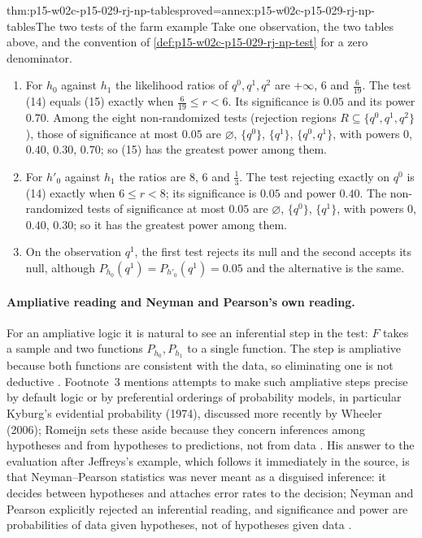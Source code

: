 \begin{hbtheorem}{thm:p15-w02c-p15-029-rj-np-tables}{proved=annex:p15-w02c-p15-029-rj-np-tables}{The two tests of the farm example}
Take one observation, the two tables above, and the convention of
\cref{def:p15-w02c-p15-029-rj-np-test} for a zero denominator.
\begin{enumerate}
\item For \(h_0\) against \(h_1\) the likelihood ratios of
  \(q^0,q^1,q^2\) are \(+\infty\), \(6\) and \(\tfrac{6}{19}\). The
  test (14) equals (15) exactly when \(\tfrac{6}{19}\le r<6\). Its
  significance is \(0.05\) and its power \(0.70\). Among the eight
  non-randomized tests (rejection regions
  \(R\subseteq\{q^0,q^1,q^2\}\)), those of significance at most
  \(0.05\) are \(\varnothing\), \(\{q^0\}\), \(\{q^1\}\),
  \(\{q^0,q^1\}\), with powers \(0\), \(0.40\), \(0.30\), \(0.70\); so
  (15) has the greatest power among them.
\item For \(h'_0\) against \(h_1\) the ratios are \(8\), \(6\) and
  \(\tfrac13\). The test rejecting exactly on \(q^0\) is (14) exactly
  when \(6\le r<8\); its significance is \(0.05\) and power \(0.40\). The
  non-randomized tests of significance at most \(0.05\) are
  \(\varnothing\), \(\{q^0\}\), \(\{q^1\}\), with powers \(0\),
  \(0.40\), \(0.30\); so it has the greatest power among them.
\item On the observation \(q^1\), the first test rejects its null and
  the second accepts its null, although
  \(P_{h_0}(q^1)=P_{h'_0}(q^1)=0.05\) and the alternative is the same.
\end{enumerate}
\end{hbtheorem}

\paragraph{Ampliative reading and Neyman and Pearson's own reading.}
For an ampliative logic it is natural to see an inferential step in the
test: \(F\) takes a sample and two functions \(P_{h_0},P_{h_1}\) to a
single function. The step is ampliative because both functions are
consistent with the data, so eliminating one is not deductive
\cite[p.~639]{Romeijn2011InductiveLogicStatistics}. Footnote~3 mentions
attempts to make such ampliative steps precise by default logic or by
preferential orderings of probability models, in particular Kyburg's
evidential probability (1974), discussed more recently by Wheeler
(2006); Romeijn sets these aside because they concern inferences among
hypotheses and from hypotheses to predictions, not from data
\cite[p.~639 n.~3]{Romeijn2011InductiveLogicStatistics}. His answer
to the evaluation after Jeffreys's example, which follows it
immediately in the source, is that Neyman--Pearson statistics was never
meant as a disguised inference: it decides between hypotheses and attaches error rates to the
decision; Neyman and Pearson explicitly rejected an inferential reading,
and significance and power are probabilities of data given hypotheses,
not of hypotheses given data \cite[p.~640]{Romeijn2011InductiveLogicStatistics}.

